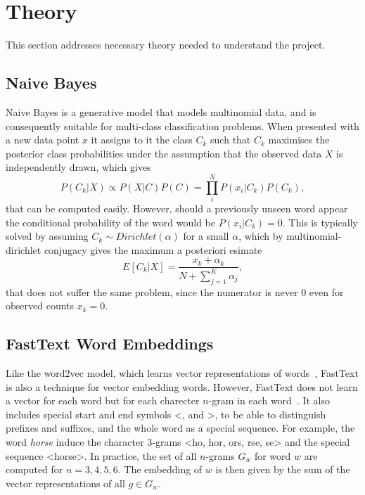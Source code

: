 \chapter{Theory}
This section addresses necessary theory needed to understand the project.

\section{Naive Bayes}
Naive Bayes is a generative model that models multinomial data, and is consequently suitable for multi-class classification problems. When presented with a new data point $x$ it assigns to it the class $C_k$ such that $C_k$ maximises the posterior class probabilities under the assumption that the observed data $X$ is independently drawn, which gives
\begin{equation}
    P(C_k | X) \propto P(X | C)P(C) = \prod_{i}^{N}P(x_{i}|C_{k})P(C_{k}), 
\end{equation}
that can be computed easily. However, should a previously unseen word
appear the conditional probability of the word would be
$P(x_i|C_k)=0$. This is typically solved by assuming $C_{k} \sim
Dirichlet(\alpha)$ for a small $\alpha$, which by
multinomial-dirichlet conjugacy gives the maximum a posteriori esimate
\begin{equation}
  E[C_{k} | X] = \frac{x_{k}+ \alpha_{k}}{N + \sum_{j=1}^{K}\alpha_{j}},
\end{equation}
that does not suffer the same problem, since the numerator is never $0$ even for observed counts $x_{k} = 0$.

\section{FastText Word Embeddings}
Like the word2vec model, which learns vector representations of
words~\cite{Mikolov2013Jan}, FastText is also a technique for vector
embedding words. However, FastText does not learn a vector for each
word but for each charecter $n$-gram in each
word~\cite{Bojanowski2016Jul}. It also includes special start and end
symbols <, and >, to be able to distinguish prefixes and suffixes, and
the whole word as a special sequence. For example, the word
\textit{horse} induce the character 3-grams <ho, hor, ors, rse, se>
and the special sequence <horse>. In practice, the set of all
$n$-grams $G_w$ for word $w$ are computed for $n = 3, 4, 5, 6$. The embedding of
$w$ is then given by the sum of the vector representations of all
$g \in G_w$.

